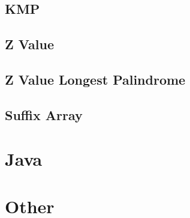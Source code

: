 \documentclass[10pt,twocolumn,oneside]{article}
\begin{document}
    \subsection{KMP}
    
    \subsection{Z Value}
    
    \subsection{Z Value Longest Palindrome}
    
    \subsection{Suffix Array}
    
    \newpage

	\section{Java}
	
	\newpage
    \section{Other}
    
    \newpage

    
\end{document}
